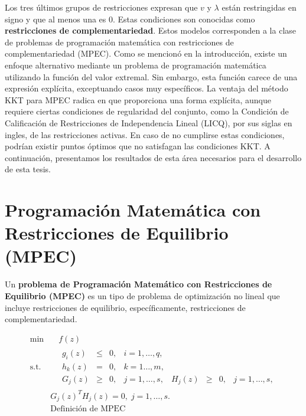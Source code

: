 Los tres últimos grupos de restricciones expresan que $v$ y $\lambda$ están restringidas en signo y que al menos una es 0. Estas condiciones son conocidas como \textbf{restricciones de complementariedad}. Estos modelos corresponden a la clase de problemas de programación matemática con restricciones de complementariedad (MPEC). 
Como se mencionó en la introducción, existe un enfoque alternativo mediante un problema de programación matemática utilizando la función del valor extremal. Sin embargo, esta función carece de una expresión explícita, exceptuando casos muy específicos. La ventaja del método KKT para MPEC radica en que proporciona una forma explícita, aunque requiere ciertas condiciones de regularidad del conjunto, como la Condición de Calificación de Restricciones de Independencia Lineal (LICQ), por sus siglas en ingles, de las restricciones activas. En caso de no cumplirse estas condiciones, podrían existir puntos óptimos que no satisfagan las condiciones KKT.
A continuación, presentamos los resultados de esta área necesarios para el desarrollo de esta tesis.

\section{Programación Matemática con Restricciones de Equilibrio (MPEC)}
Un \textbf{problema de Programación Matemático con Restricciones de Equilibrio (MPEC)} es un tipo de  problema de optimización no lineal que incluye restricciones de equilibrio, específicamente, restricciones de complementariedad.

\begin{equation}
\begin{aligned}
\min  &\quad  f(z)  \\
\text{s.t.} &\quad \begin{matrix} g_i(z)& \leq& 0, &i=1,\ldots,q, \\ h_k(z) &=& 0,&k=1\ldots,m, \\
 G_j(z) &\geq& 0, & j=1,\ldots,s,& H_j(z) &\geq& 0, & j=1,\ldots,s, \end{matrix}
\\&G_j(z)^T H_j(z) = 0,\; j=1,\ldots,s. \\
&\text{Definición de MPEC} \\
\end{aligned}  
\label{eq:DefMpec}
\end{equation}

